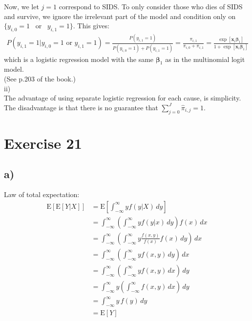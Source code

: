 \documentclass[a4paper]{article}
\newcommand{\E}{\mathrm{E}}
\begin{document}
Now, we let $j=1$ correspond to SIDS. To only consider those who dies of SIDS and survive, we ignore the irrelevant part of the model and condition only on $\{y_{i,0} = 1$ \mbox{~or~} $y_{i,1} = 1\}$. This gives:
\begin{align*}
P(y_{i,1} = 1 | y_{i,0} = 1 \mbox{~or~} y_{i,1} = 1) = \frac{P(y_{i,1} = 1)}{P(y_{i,0} = 1) + P(y_{i,1} = 1)} = \frac{\pi_{i,1}}{\pi_{i,0}+\pi_{i,1}} = \frac{\exp\left[\bm{x}_{i}\bm{\beta}_{1}\right]}{1+\exp\left[\bm{x}_{i}\bm{\beta}_{1}\right]}
\end{align*}
which is a logistic regression model with the same $\bm{\beta}_{1}$ as in the multinomial logit model.\\
(See p.203 of the book.)\\

ii)\\
The advantage of using separate logistic regression for each cause, is simplicity.\\
The disadvantage is that there is no guarantee that $\sum_{j=0}^{J} \widehat{\pi}_{i,j} = 1$.


\vspace{\baselineskip}
\section{Exercise 21}
\subsection{a)}
Law of total expectation:
\begin{align*}
\E\left[\E\left[Y|X\right]\right] &= \E\left[\int_{-\infty}^{\infty} yf(y|X)\, dy \right]\\
&= \int_{-\infty}^{\infty} \left(\int_{-\infty}^{\infty} yf(y|x)\, dy\right) f(x) \, dx\\
&= \int_{-\infty}^{\infty} \left(\int_{-\infty}^{\infty} y\frac{f(x,y)}{f(x)}f(x) \, dy\right)\, dx\\
&= \int_{-\infty}^{\infty} \left(\int_{-\infty}^{\infty} y f(x,y) \, dy\right)\, dx\\
&= \int_{-\infty}^{\infty} \left(\int_{-\infty}^{\infty} y f(x,y) \, dx\right)\, dy\\
&= \int_{-\infty}^{\infty} y\left(\int_{-\infty}^{\infty} f(x,y) \, dx\right)\, dy\\
&= \int_{-\infty}^{\infty} y \, f(y)\, dy\\
&= \E\left[Y\right]
\end{align*}
\end{document}
